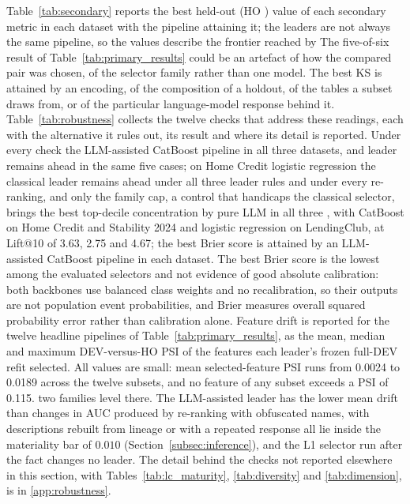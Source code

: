 \documentclass[final,5p,twocolumn]{elsarticle}
\providecommand{\DIFaddtex}[1]{{\protect\color{blue} \sf #1}} %
\providecommand{\DIFdeltex}[1]{{\protect\color{red} \scriptsize #1}} %
\providecommand{\DIFaddbegin}{} %
\providecommand{\DIFaddend}{} %
\providecommand{\DIFdelbegin}{} %
\providecommand{\DIFdelend}{} %
\providecommand{\DIFadd}[1]{\texorpdfstring{\DIFaddtex{#1}}{#1}} %
\providecommand{\DIFdel}[1]{\texorpdfstring{\DIFdeltex{#1}}{}} %
\begin{document}
\DIFdelbegin \DIFdel{Table~\ref{tab:secondary} reports the best held-out (HO ) value of each secondary metric in each dataset with the pipeline attaining it; the leaders are not always the same pipeline, so the values describe the frontier reached by }\DIFdelend \DIFaddbegin \DIFadd{The five-of-six result of Table~\ref{tab:primary_results} could be an artefact of how the compared pair was chosen, of }\DIFaddend the \DIFdelbegin \DIFdel{selector family rather than one model. The best KS is attained by an }\DIFdelend \DIFaddbegin \DIFadd{encoding, of the composition of a holdout, of the tables a subset draws from, or of the particular language-model response behind it. Table~\ref{tab:robustness} collects the twelve checks that address these readings, each with the alternative it rules out, its result and where its detail is reported. Under every check the }\DIFaddend LLM-assisted \DIFdelbegin \DIFdel{CatBoost pipeline in all three datasets, and }\DIFdelend \DIFaddbegin \DIFadd{leader remains ahead in the same five cases; on Home Credit logistic regression the classical leader remains ahead under all three leader rules and under every re-ranking, and only the family cap, a control that handicaps the classical selector, brings }\DIFaddend the \DIFdelbegin \DIFdel{best top-decile concentration by pure LLM in all three , with CatBoost on Home Credit and Stability 2024 and logistic regression on LendingClub, at Lift@10 of 3.63, 2.75 and 4.67; the best Brier score is attained by an LLM-assisted CatBoost pipeline in each dataset. The best Brier score is the lowest among the evaluated selectors and not evidence of good absolute calibration: both backbones use balanced class weights and no recalibration, so their outputs are not population event probabilities, and Brier measures overall squared probability error rather than calibration alone. Feature drift is reported for the twelve headline pipelines of Table~\ref{tab:primary_results}, as the mean, median and maximum DEV-versus-HO PSI of the features each leader's frozen full-DEV refit selected. All values are small: mean selected-feature PSI runs from 0.0024 to 0.0189 across the twelve subsets, and no feature of any subset exceeds a PSI of 0.115. }\DIFdelend \DIFaddbegin \DIFadd{two families level there. }\DIFaddend The \DIFdelbegin \DIFdel{LLM-assisted leader has the lower mean drift than }\DIFdelend \DIFaddbegin \DIFadd{changes in AUC produced by re-ranking with obfuscated names, with descriptions rebuilt from lineage or with a repeated response all lie inside the materiality bar of $0.010$ (Section~\ref{subsec:inference}), and the L1 selector run after the fact changes no leader. The detail behind the checks not reported elsewhere in this section, with Tables~\ref{tab:lc_maturity}, \ref{tab:diversity} and \ref{tab:dimension}, is in \ref{app:robustness}.
}
\end{document}
